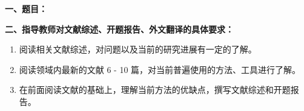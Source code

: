 {
    \setlength{\parindent}{0em}
    \par {\bfseries 一、题目：\Title}
    \\
    \par {\bfseries 二、指导教师对文献综述、开题报告、外文翻译的具体要求：}

    \begin{enumerate}
    \item 阅读相关文献综述，对问题以及当前的研究进展有一定的了解。
    \item 阅读领域内最新的文献 6 - 10 篇，对当前普遍使用的方法、工具进行了解。
    \item 在前面阅读文献的基础上，理解当前方法的优缺点，撰写文献综述和开题报告。
    \end{enumerate}
}

\mbox{} \vfill

\signature{指导教师（签名）}
